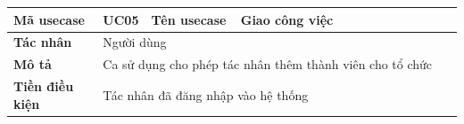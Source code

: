 \documentclass[../DoAn.tex]{subfiles}
\begin{document}
\begin{table}[ht]
    \renewcommand{\arraystretch}{1.2}
    \centering
    \begin{tabular}{| p{0.2\linewidth} | p{0.1\linewidth} | p{0.2\linewidth} | p{0.5\linewidth} |}
        \hline
        \textbf{Mã usecase}                                          & UC05                                                                                         & \textbf{Tên usecase}                                       & Giao công việc                                                                                                                        \\ \hline
        \multicolumn{1}{|p{0.2\linewidth}|}{\textbf{Tác nhân}}       & \multicolumn{3}{p{0.8\linewidth}|}{Người dùng}                                                                                                                                                                                                                                                    \\ \hline
        \multicolumn{1}{|p{0.2\linewidth}|}{\textbf{Mô tả}}          & \multicolumn{3}{p{0.8\linewidth}|}{Ca sử dụng cho phép tác nhân thêm thành viên cho tổ chức}                                                                                                                                                                                                      \\ \hline
        \multicolumn{1}{|p{0.2\linewidth}|}{\textbf{Tiền điều kiện}} & \multicolumn{3}{p{0.8\linewidth}|}{Tác nhân đã đăng nhập vào hệ thống}                                                                                                                                                                                                                            \\ \hline


\end{tabular}
\end{table}
\end{document}
